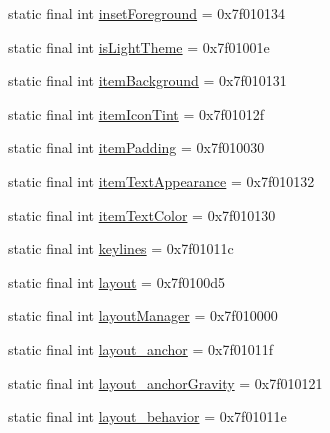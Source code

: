 \begin{CompactItemize}
\item 
static final int \hyperlink{classandroid_1_1support_1_1graphics_1_1drawable_1_1animated_1_1_r_1_1attr_8c96ab28909007663d1695bf3dea5a8a}{insetForeground} = 0x7f010134
\item 
static final int \hyperlink{classandroid_1_1support_1_1graphics_1_1drawable_1_1animated_1_1_r_1_1attr_d40ca602c68846dc4d97a5ef5fc64809}{isLightTheme} = 0x7f01001e
\item 
static final int \hyperlink{classandroid_1_1support_1_1graphics_1_1drawable_1_1animated_1_1_r_1_1attr_1e81f1ba6d72b247099c7d265023f039}{itemBackground} = 0x7f010131
\item 
static final int \hyperlink{classandroid_1_1support_1_1graphics_1_1drawable_1_1animated_1_1_r_1_1attr_edbabf23dad461fb9f185b74ce7e9416}{itemIconTint} = 0x7f01012f
\item 
static final int \hyperlink{classandroid_1_1support_1_1graphics_1_1drawable_1_1animated_1_1_r_1_1attr_bbf353ce05eb4ecfc9da7dad97e50279}{itemPadding} = 0x7f010030
\item 
static final int \hyperlink{classandroid_1_1support_1_1graphics_1_1drawable_1_1animated_1_1_r_1_1attr_6ba0754fc56d8ba8b4f86a055081deb6}{itemTextAppearance} = 0x7f010132
\item 
static final int \hyperlink{classandroid_1_1support_1_1graphics_1_1drawable_1_1animated_1_1_r_1_1attr_a242b2f85a442e3104a75f57f97ae835}{itemTextColor} = 0x7f010130
\item 
static final int \hyperlink{classandroid_1_1support_1_1graphics_1_1drawable_1_1animated_1_1_r_1_1attr_41d8e03485971de44fcef3e78b3d3197}{keylines} = 0x7f01011c
\item 
static final int \hyperlink{classandroid_1_1support_1_1graphics_1_1drawable_1_1animated_1_1_r_1_1attr_023298e2d6c11b95467a1e988039280a}{layout} = 0x7f0100d5
\item 
static final int \hyperlink{classandroid_1_1support_1_1graphics_1_1drawable_1_1animated_1_1_r_1_1attr_35202098ebac7916e8289eaaf51403ff}{layoutManager} = 0x7f010000
\item 
static final int \hyperlink{classandroid_1_1support_1_1graphics_1_1drawable_1_1animated_1_1_r_1_1attr_ae8cb52abaac96f29547338f0ee687ae}{layout\_\-anchor} = 0x7f01011f
\item 
static final int \hyperlink{classandroid_1_1support_1_1graphics_1_1drawable_1_1animated_1_1_r_1_1attr_846f340c02cf9ae1a17f20d930847508}{layout\_\-anchorGravity} = 0x7f010121
\item 
static final int \hyperlink{classandroid_1_1support_1_1graphics_1_1drawable_1_1animated_1_1_r_1_1attr_1597bbb9aa3502f32bdefcb92b9048f3}{layout\_\-behavior} = 0x7f01011e

\end{CompactItemize}
